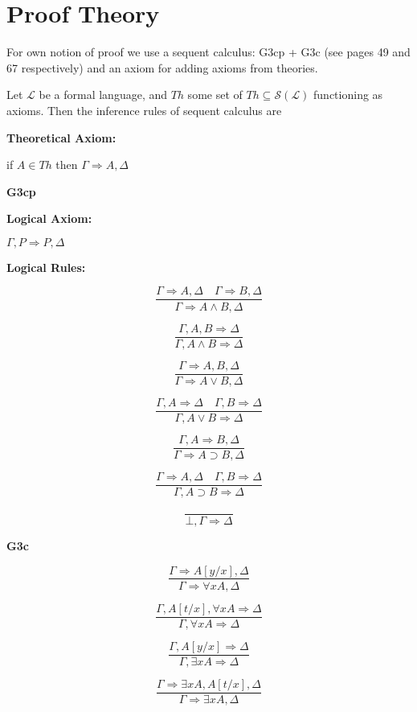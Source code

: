 \chapter{Proof Theory}\label{chapter:proof-theory}
For own notion of proof we use a sequent calculus: G3cp + G3c (see \cite{negri:2001} pages 49 and 67 respectively) and an axiom for adding axioms from theories.
\begin{definition}\label{def:Seq-Calc}
    Let $\mathcal{L}$ be a formal language, and $Th$ some set of $Th \subseteq \mathcal{S}(\mathcal{L})$ functioning as axioms. Then the inference rules of sequent calculus are

\noindent \textbf{Theoretical Axiom:}

if $A \in Th$ then $\Gamma \Rightarrow A, \Delta$

\begin{center}
    \textbf{G3cp}
\end{center}
\noindent \textbf{Logical Axiom:}

$\Gamma, P \Rightarrow P, \Delta$

\noindent \textbf{Logical Rules:}
\begin{multicols}{2}
\[
\frac{\Gamma \Rightarrow A, \Delta \quad \Gamma \Rightarrow B, \Delta}{\Gamma \Rightarrow A \land B, \Delta}\tag{$R\land$}
\]

\[
\frac{\Gamma, A, B \Rightarrow \Delta}{\Gamma, A \land B \Rightarrow \Delta}\tag{$L\land$}
\]

\[
\frac{\Gamma \Rightarrow A, B, \Delta}{\Gamma \Rightarrow A \lor B, \Delta}\tag{$R\lor$}
\]

\[
\frac{\Gamma, A \Rightarrow \Delta \quad \Gamma, B \Rightarrow \Delta}{\Gamma, A \lor B \Rightarrow \Delta}\tag{$L\lor$}
\]

\[
\frac{\Gamma, A \Rightarrow B, \Delta}{\Gamma \Rightarrow A \supset B, \Delta}\tag{$R\supset$}
\]

\[
\frac{\Gamma \Rightarrow A, \Delta \quad \Gamma, B \Rightarrow \Delta}{\Gamma, A \supset B \Rightarrow \Delta}\tag{$L\supset$}
\]

\[
\frac{}{\bot, \Gamma \Rightarrow \Delta}\tag{$L\bot$}
\]

\end{multicols}

\begin{center}
    \textbf{G3c}
\end{center}
\begin{multicols}{2}

\[
\frac{\Gamma \Rightarrow A[y/x], \Delta}{\Gamma \Rightarrow \forall x A, \Delta}\tag{$R\forall$}
\]

\[
\frac{\Gamma, A[t/x], \forall x A \Rightarrow \Delta}{\Gamma, \forall x A \Rightarrow \Delta}\tag{$L\forall$}
\]

\[
\frac{\Gamma, A[y/x] \Rightarrow \Delta}{\Gamma, \exists x A \Rightarrow \Delta}\tag{$L\exists$}
\]

\[
\frac{\Gamma \Rightarrow \exists x A, A[t/x], \Delta}{\Gamma \Rightarrow \exists x A, \Delta}\tag{$R\exists$}
\]

\end{multicols}

\end{definition}
